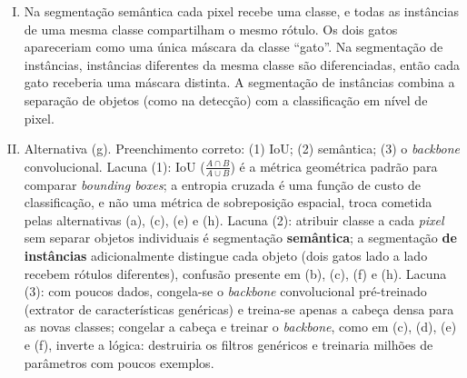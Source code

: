 \documentclass{dlproblemset}
\begin{document}
\begin{enumerate}[I)]
\item Na segmentação semântica cada pixel recebe uma classe, e todas as instâncias de uma mesma classe compartilham o mesmo rótulo. Os dois gatos apareceriam como uma única máscara da classe ``gato''. Na segmentação de instâncias, instâncias diferentes da mesma classe são diferenciadas, então cada gato receberia uma máscara distinta. A segmentação de instâncias combina a separação de objetos (como na detecção) com a classificação em nível de pixel.

\item Alternativa (g). Preenchimento correto: (1) IoU; (2) semântica; (3) o \textit{backbone} convolucional. Lacuna (1): IoU ($\frac{A \cap B}{A \cup B}$) é a métrica geométrica padrão para comparar \textit{bounding boxes}; a entropia cruzada é uma função de custo de classificação, e não uma métrica de sobreposição espacial, troca cometida pelas alternativas (a), (c), (e) e (h). Lacuna (2): atribuir classe a cada \textit{pixel} sem separar objetos individuais é segmentação \textbf{semântica}; a segmentação \textbf{de instâncias} adicionalmente distingue cada objeto (dois gatos lado a lado recebem rótulos diferentes), confusão presente em (b), (c), (f) e (h). Lacuna (3): com poucos dados, congela-se o \textit{backbone} convolucional pré-treinado (extrator de características genéricas) e treina-se apenas a cabeça densa para as novas classes; congelar a cabeça e treinar o \textit{backbone}, como em (c), (d), (e) e (f), inverte a lógica: destruiria os filtros genéricos e treinaria milhões de parâmetros com poucos exemplos.

\end{enumerate}
\end{document}
